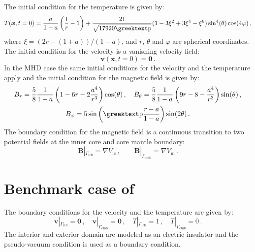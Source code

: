 The initial condition for the temperature is given by:
\begin{equation}
	T(\bm{x},t=\num{0})=\frac{a}{1-a}\left(\frac{1}{r}-1\right)+\frac{21}{\sqrt{17920\gpi}}(1-3\xi^2+3\xi^4-\xi^6)\sin^4(\theta)\cos(4\varphi)\,,
\end{equation}
where $\xi=(2r-(1+a))/(1-a)$, and $r$, $\theta$ and $\varphi$ are spherical coordinates. The initial condition for the velocity is a vanishing velocity field:
\begin{equation}
	\bm{v}(\bm{x},t=\num{0})=\bm{0}\,.
\end{equation}
In the MHD case the same initial conditions for the velocity and the temperature apply and the initial condition for the magnetic field is given by:
\begin{equation}
\begin{gathered}
	B_r=\frac{5}{8}\frac{1}{1-a}\left(1-6r-2\frac{a^4}{r^3}\right)\cos(\theta)\,,\quad
	B_\theta=\frac{5}{8}\frac{1}{1-a}\left(9r-8-\frac{a^4}{r^3}\right)\sin(\theta)\,,\\
	B_\varphi=5\sin\left(\gpi\frac{r-a}{1-a}\right)\sin(2\theta)\,.
\end{gathered}
\end{equation}
The boundary condition for the magnetic field is a continuous transition to two potential fields at the inner core and core mantle boundary:
\begin{equation}
	\bm{B}|_{\Gamma_\mathrm{icb}}=\nabla V_\mathrm{ic}\,,\qquad
	\bm{B}|_{\Gamma_\mathrm{cmb}}=\nabla V_\mathrm{m}\,.
\end{equation}

\section{Benchmark case of \citeauthor{Jackson2014}}
The boundary conditions for the velocity and the temperature are given by:
\begin{equation}
	\bm{v}|_{\Gamma_\mathrm{icb}}=\bm{0}\,,\quad
	\bm{v}|_{\Gamma_\mathrm{cmb}}=\bm{0}\,,\quad
	T|_{\Gamma_\mathrm{icb}}=1\,,\quad
	T|_{\Gamma_\mathrm{cmb}}=0\,.
\end{equation}
The interior and exterior domain are modeled as an electric insulator and the pseudo-vacuum condition is used as a boundary condition.


